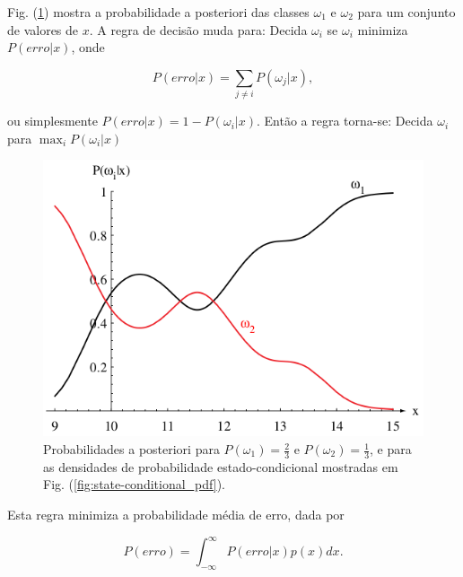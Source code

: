\documentclass[a4paper,12pt,twocolumn]{article}
\newcommand{\figureref}[1]{Fig. (\ref{fig:#1})}
\begin{document}
\figureref{posteriori_prob} mostra a probabilidade a posteriori das classes $\omega_1$ e $\omega_2$ para um conjunto de valores de $x$. A regra de decisão muda para: Decida $\omega_i$ se $\omega_i$ minimiza $P(erro|x)$, onde

\begin{equation}
    P(erro|x) = \sum_{j\neq i} P(\omega_j|x),
    \label{eq:bayes}
\end{equation}

\noindent ou simplesmente $P(erro|x) = 1 - P(\omega_i|x)$. Então a regra torna-se: Decida $\omega_i$ para $\max_i P(\omega_i|x)$

\begin{figure}[ht]
    \centering
    \includegraphics[scale=0.4]{posteriori_prob}
    \caption{Probabilidades a posteriori para $P(\omega_1) = \frac{2}{3}$ e $P(\omega_2) = \frac{1}{3}$, e para as densidades de probabilidade estado-condicional mostradas em \figureref{state-conditional_pdf}.}
    \label{fig:posteriori_prob}
\end{figure}

Esta regra minimiza a probabilidade média de erro, dada por

\begin{equation}
    P(erro) = \int_{-\infty}^{\infty} P(erro|x)p(x) dx.
    \label{eq:bayes}
\end{equation}
\end{document}
